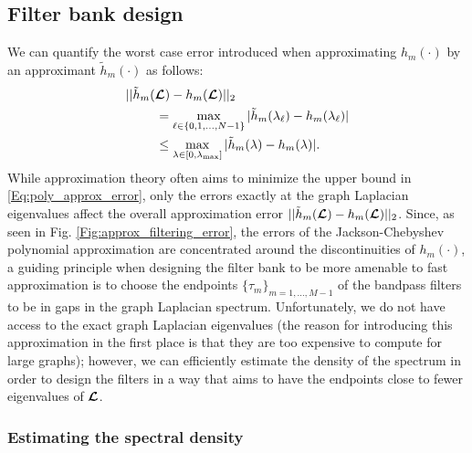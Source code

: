\documentclass[journal, 10pt]{IEEEtran}
\begin{document}

\subsection{Filter bank design}

We can quantify the worst case error introduced when approximating  $h_m(\cdot)$ by an approximant $\tilde{h}_m(\cdot)$ as follows:
\begin{align} \label{Eq:poly_approx_error}
&||\tilde{h}_m(\L)-h_m(\L) ||_2  \nonumber \\ &~~~~~~~= \max_{\l \in \{0,1,\ldots,N-1\}}|\tilde{h}_m(\lambda_{\l})-h_m(\lambda_{\l}) |  \nonumber \\
 &~~~~~~~\leq \max_{\lambda \in [0,\lambda_{\max}]}|\tilde{h}_m(\lambda)-h_m(\lambda) |.
\end{align}
While approximation theory often aims to minimize the upper bound in \eqref{Eq:poly_approx_error}, only the errors exactly at the graph Laplacian eigenvalues affect the overall approximation error $||\tilde{h}_m(\boldsymbol{\mathcal{L}})-h_m(\boldsymbol{\mathcal{L}}) ||_2$. Since, as seen in Fig. \ref{Fig:approx_filtering_error}, the errors of the Jackson-Chebyshev polynomial approximation are concentrated around the discontinuities of $h_m(\cdot)$, a guiding principle when designing the filter bank to be more amenable to fast approximation is to choose the endpoints $\{\tau_m\}_{m=1,\ldots,M-1}$ of the bandpass filters to be in gaps in the graph Laplacian spectrum. Unfortunately, we do not have access to the exact graph Laplacian eigenvalues (the reason for introducing this approximation in the first place is that they are too expensive to compute for large graphs); however, we can efficiently estimate the density of the spectrum in order to design the filters in a way that aims to have the endpoints close to fewer eigenvalues of $\boldsymbol{\mathcal{L}}$.

\subsubsection{Estimating the spectral density} \label{Se:spectral_density}
\end{document}
